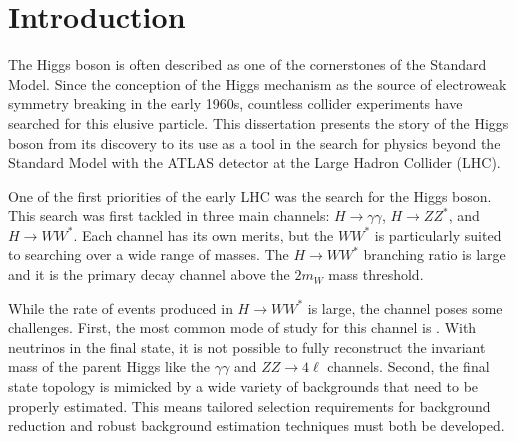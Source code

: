 \chapter{Introduction}
\label{introduction}

The Higgs boson is often described as one of the cornerstones of the Standard Model. Since the conception of the Higgs mechanism as the source of electroweak symmetry breaking in the early 1960s, countless collider experiments have searched for this elusive particle. This dissertation presents the story of the Higgs boson from its discovery to its use as a tool in the search for physics beyond the Standard Model with the ATLAS detector at the Large Hadron Collider (LHC). 

One of the first priorities of the early LHC was the search for the Higgs boson. This search was first tackled in three main channels: $H\to \gamma\gamma$, $H\to ZZ^*$, and $H\to WW^*$. Each channel has its own merits, but the $WW^*$ is particularly suited to searching over a wide range of masses. The $H\to WW^*$ branching ratio is large and it is the primary decay channel above the $2m_W$ mass threshold. 

While the rate of events produced in $H\to WW^*$ is large, the channel poses some challenges. First, the most common mode of study for this channel is \HWWfull. With neutrinos in the final state, it is not possible to fully reconstruct the invariant mass of the parent Higgs like the $\gamma\gamma$ and $ZZ\to 4\ell$ channels. Second, the final state topology is mimicked by a wide variety of backgrounds that need to be properly estimated. This means tailored selection requirements for background reduction and robust background estimation techniques must both be developed. 


